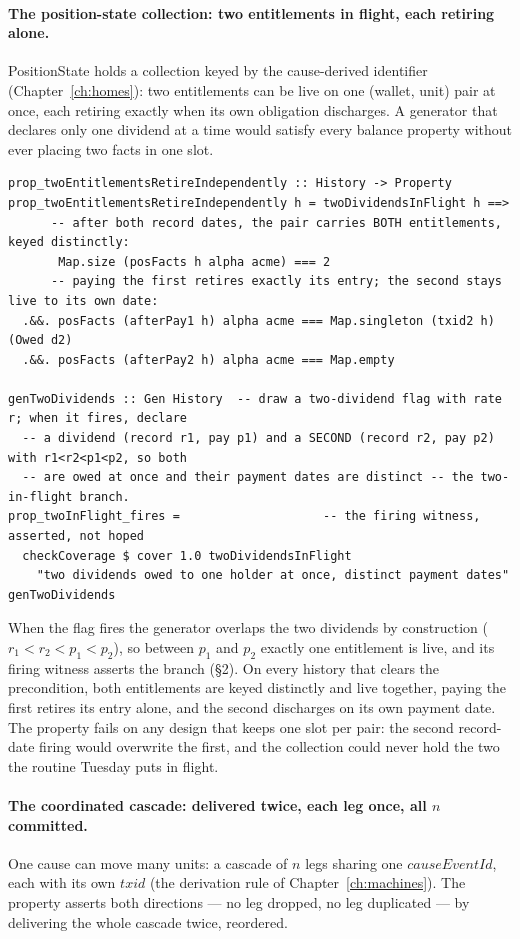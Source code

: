\documentclass[11pt,a4paper]{article}
\begin{document}
\paragraph{The position-state collection: two entitlements in flight, each retiring alone.}
PositionState holds a collection keyed by the cause-derived identifier
(Chapter~\ref{ch:homes}): two entitlements can be live on one (wallet, unit) pair at once,
each retiring exactly when its own obligation discharges. A generator that declares only one
dividend at a time would satisfy every balance property without ever placing two facts in
one slot.

\begin{lstlisting}
prop_twoEntitlementsRetireIndependently :: History -> Property
prop_twoEntitlementsRetireIndependently h = twoDividendsInFlight h ==>
      -- after both record dates, the pair carries BOTH entitlements, keyed distinctly:
       Map.size (posFacts h alpha acme) === 2
      -- paying the first retires exactly its entry; the second stays live to its own date:
  .&&. posFacts (afterPay1 h) alpha acme === Map.singleton (txid2 h) (Owed d2)
  .&&. posFacts (afterPay2 h) alpha acme === Map.empty

genTwoDividends :: Gen History  -- draw a two-dividend flag with rate r; when it fires, declare
  -- a dividend (record r1, pay p1) and a SECOND (record r2, pay p2) with r1<r2<p1<p2, so both
  -- are owed at once and their payment dates are distinct -- the two-in-flight branch.
prop_twoInFlight_fires =                    -- the firing witness, asserted, not hoped
  checkCoverage $ cover 1.0 twoDividendsInFlight
    "two dividends owed to one holder at once, distinct payment dates" genTwoDividends
\end{lstlisting}

When the flag fires the generator overlaps the two dividends by construction ($r_1<r_2<p_1<p_2$),
so between $p_1$ and $p_2$ exactly one entitlement is live, and its firing witness asserts the
branch (\S 2). On every history that clears the precondition, both
entitlements are keyed distinctly and live together, paying the first retires its entry alone,
and the second discharges on its own payment date. The property fails on any design that keeps
one slot per pair: the second record-date firing would overwrite the first, and the collection
could never hold the two the routine Tuesday puts in flight.

\paragraph{The coordinated cascade: delivered twice, each leg once, all $n$ committed.}
One cause can move many units: a cascade of $n$ legs sharing one $\mathit{causeEventId}$,
each with its own $\mathit{txid}$ (the derivation rule of Chapter~\ref{ch:machines}).
The property asserts both directions --- no leg dropped, no leg duplicated --- by
delivering the whole cascade twice, reordered.
\end{document}
